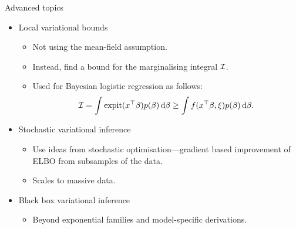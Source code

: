 \begin{frame}{Advanced topics}
  \begin{itemize}
    \item<1-> Local variational bounds 
    \begin{itemize}
      \item Not using the mean-field assumption.
      \item Instead, find a bound for the marginalising integral ${\mathcal I}$.
      \item Used for Bayesian logistic regression as follows:
      \[
        {\mathcal I} = \int \operatorname{expit}(x^\top\beta) p(\beta) \, \text{d}\beta \geq \int f(x^\top\beta,\xi) p(\beta) \, \text{d}\beta.
      \]
    \end{itemize}
    \item<2-> Stochastic variational inference
    \begin{itemize}
      \item Use ideas from stochastic optimisation---gradient based improvement of ELBO from subsamples of the data.
      \item Scales to massive data.
    \end{itemize}
    \item<3-> Black box variational inference
    \begin{itemize}
      \item Beyond exponential families and model-specific derivations.
    \end{itemize}
  \end{itemize}
\end{frame}
